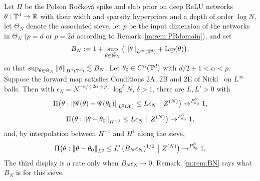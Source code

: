 \begin{theorem}\label{m:thm:PR}
Let $\Pi$ be the Polson Ro\v{c}kov\'a spike and slab prior on deep ReLU networks $\theta:\mathbb{T}^d\to\mathbb{R}$ with their width and sparsity hyperpriors and a depth of order $\log N$, let $\Theta_N$ denote the associated sieve, let $p$ be the input dimension of the networks in $\Theta_N$ ($p=d$ or $p=2d$ according to Remark~\ref{m:rem:PRdomain}), and set
\begin{equation}\label{m:eq:BN}
B_N:=1+\sup_{\theta\in\Theta_N}\big(\left\|\theta\right\|_{L^\infty(\mathbb{T}^d)}+\mathrm{Lip}(\theta)\big),
\end{equation}
so that $\sup_{\theta\in\Theta_N}\left\|\theta\right\|_{H^1(\mathbb{T}^d)}\lesssim B_N$. Let $\theta_0\in C^\alpha(\mathbb{T}^d)$ with $d/2+1<\alpha<p$. Suppose the forward map satisfies Conditions 2A, 2B and 2E of Nickl~\cite{nicklbvm2024} on $L^\infty$ balls. Then with $\epsilon_N=N^{-\alpha/(2\alpha+p)}\log^\delta N$, $\delta>1$, there are $L,L'>0$ with
\[
\Pi\big(\theta:\left\|\mathscr{G}(\theta)-\mathscr{G}(\theta_0)\right\|_{L^2(\mathcal X)}\le L\epsilon_N\ \big|\ Z^{(N)}\big)\to^{P^{\mathbb{N}}_{\theta_0}}1,
\]
\[
\Pi\big(\theta:\left\|\theta-\theta_0\right\|_{H^{-1}}\le L\epsilon_N\ \big|\ Z^{(N)}\big)\to^{P^{\mathbb{N}}_{\theta_0}}1 ,
\]
and, by interpolation between $H^{-1}$ and $H^1$ along the sieve,
\[
\Pi\big(\theta:\left\|\theta-\theta_0\right\|_{L^2}\le L'\,(B_N\epsilon_N)^{1/2}\ \big|\ Z^{(N)}\big)\to^{P^{\mathbb{N}}_{\theta_0}}1 .
\]
The third display is a rate only when $B_N\epsilon_N\to0$; Remark~\ref{m:rem:BN} says what $B_N$ is for this sieve.
\end{theorem}

